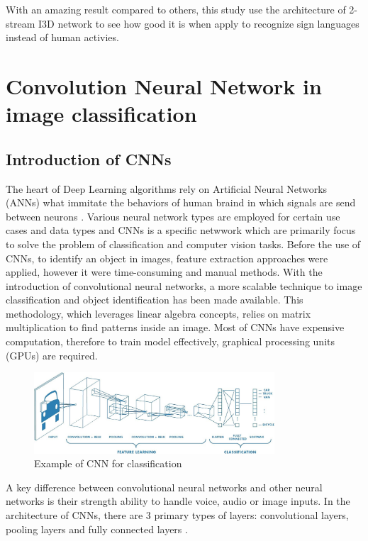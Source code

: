 \documentclass[a4paper, 12pt]{article}
\begin{document}
With an amazing result compared to others, this study use the architecture of 2-stream I3D network to see how good it is when apply to recognize sign languages instead of human activies.

\section{Convolution Neural Network in image classification}
\subsection{Introduction of CNNs}
The heart of Deep Learning algorithms rely on Artificial Neural Networks (ANNs) what immitate the behaviors of human braind in which signals are send between neurons \citep{ibmANN}. Various neural network types are employed for certain use cases and data types and CNNs is a specific netwwork which are primarily focus to solve the problem of classification and computer vision tasks. Before the use of CNNs, to identify an object in images, feature extraction approaches were applied, however it were time-consuming and manual methods. With the introduction of convolutional neural networks, a more scalable technique to image classification and object identification has been made available. This methodology, which leverages linear algebra concepts, relies on matrix multiplication to find patterns inside an image. Most of CNNs have expensive computation, therefore to train model effectively, graphical processing units (GPUs) are required.

\begin{figure}[H]
    \centering
    \includegraphics[width=0.8\textwidth]{Example of Classification by using CNN.jpeg}
    \caption{Example of CNN for classification}
    \label{Figure CNN for classification}
\end{figure}

A key difference between convolutional neural networks and other neural networks is their strength ability to handle voice, audio or image inputs. In the architecture of CNNs, there are 3 primary types of layers:  convolutional layers, pooling layers and fully connected layers \citep{ibmConvNet}.
\end{document}
